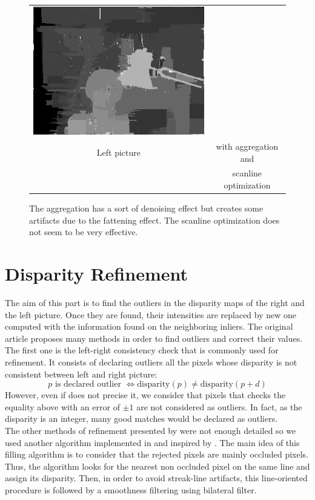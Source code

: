 \documentclass{article}
\begin{document}
\begin{figure}[h]
\begin{center}
\begin{tabular}{cc}
\includegraphics[scale=0.5]{Images/ADCensus_aggregated_so/disparity_map.png}
\\
Left picture & with aggregation and \\
& scanline optimization
\end{tabular}
	\caption{The aggregation has a sort of denoising effect but creates some artifacts due to the fattening effect. The scanline optimization does not seem to be very effective.}
	\label{soPics}
\end{center}
\end{figure}

\section{Disparity Refinement}

The aim of this part is to find the outliers in the disparity maps of the right and the left picture. Once they are found, their intensities are replaced by new one computed with the information found on the neighboring inliers. The original article
\cite{adCensus} proposes many methods in order to find outliers and correct their values.\\
The first one is the left-right consistency check that is commonly used for refinement. It consists of declaring outliers all the pixels whose disparity is not consistent between left and right picture:
\[
	p \text{ is declared outlier } \Leftrightarrow \text{disparity}(p) \neq \text{disparity}(p+d)
\]
However, even if \cite{adCensus} does not precise it, we consider that pixels that checks the equality above with an error of $\pm 1$ are not considered as outliers. In fact, as the disparity is an integer, many good matches would be declared as outliers.\\
The other methods of refinement presented by \cite{adCensus} were not enough detailed so we used another algorithm implemented in \cite{ipolFill} and inspired by \cite{cvFill}.
The main idea of this filling algorithm is to consider that the rejected pixels are mainly occluded pixels. Thus, the algorithm looks for the nearest non occluded pixel on the same line and assign its disparity. Then, in order to avoid streak-line artifacts, this line-oriented procedure is followed by a smoothness filtering using bilateral filter.
\end{document}
